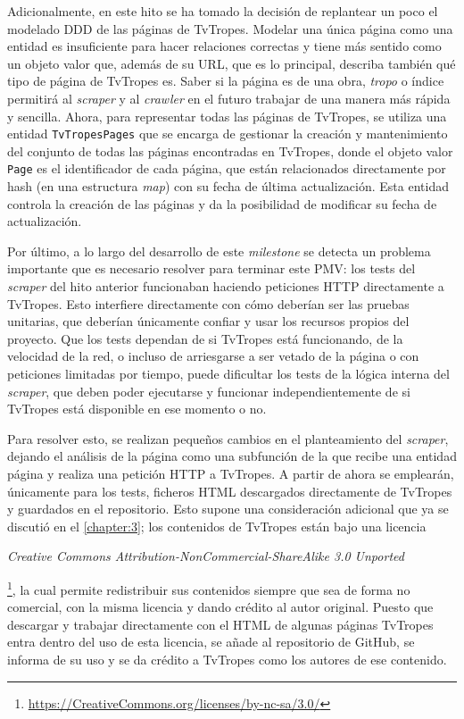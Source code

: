 Adicionalmente, en este hito se ha tomado la decisión de replantear un poco el
modelado DDD de las páginas de TvTropes. Modelar una única página como una
entidad es insuficiente para hacer relaciones correctas y tiene más sentido como
un objeto valor que, además de su URL, que es lo principal, describa también qué
tipo de página de TvTropes es. Saber si la página es de una obra, \textit{tropo}
o índice permitirá al \textit{scraper} y al \textit{crawler} en el futuro
trabajar de una manera más rápida y sencilla. Ahora, para representar todas las
páginas de TvTropes, se utiliza una entidad \texttt{TvTropesPages} que se
encarga de gestionar la creación y mantenimiento del conjunto de todas las
páginas encontradas en TvTropes, donde el objeto valor \texttt{Page} es el
identificador de cada página, que están relacionados directamente por hash (en
una estructura \textit{map}) con su fecha de última actualización. Esta entidad
controla la creación de las páginas y da la posibilidad de modificar su fecha de
actualización. 

Por último, a lo largo del desarrollo de este \textit{milestone} se detecta un
problema importante que es necesario resolver para terminar este PMV: los tests
del \textit{scraper} del hito anterior funcionaban haciendo peticiones HTTP
directamente a TvTropes. Esto interfiere directamente con cómo deberían ser las
pruebas unitarias, que deberían únicamente confiar y usar los recursos
propios del proyecto. Que los tests dependan de si TvTropes está funcionando, de
la velocidad de la red, o incluso de arriesgarse a ser vetado de la página o con
peticiones limitadas por tiempo, puede dificultar los tests de la lógica interna
del \textit{scraper}, que deben poder ejecutarse y funcionar independientemente
de si TvTropes está disponible en ese momento o no.

Para resolver esto, se realizan pequeños cambios en el planteamiento del
\textit{scraper}, dejando el análisis de la página como una subfunción de la
que recibe una entidad página y realiza una petición HTTP a TvTropes. A partir
de ahora se emplearán, únicamente para los tests, ficheros HTML descargados
directamente de TvTropes y guardados en el repositorio. Esto supone una
consideración adicional que ya se discutió en el \autoref{chapter:3}; los
contenidos de TvTropes están bajo una licencia
\begin{otherlanguage}{english}\textit{Creative Commons
Attribution-NonCommercial-ShareAlike 3.0
Unported}\end{otherlanguage}\footnote{\url{https://CreativeCommons.org/licenses/by-nc-sa/3.0/}},
la cual permite redistribuir sus contenidos siempre que sea de forma no
comercial, con la misma licencia y dando crédito al autor original. Puesto que
descargar y trabajar directamente con el HTML de algunas páginas TvTropes entra
dentro del uso de esta licencia, se añade al repositorio de GitHub, se informa
de su uso y se da crédito a TvTropes como los autores de ese contenido.
 
